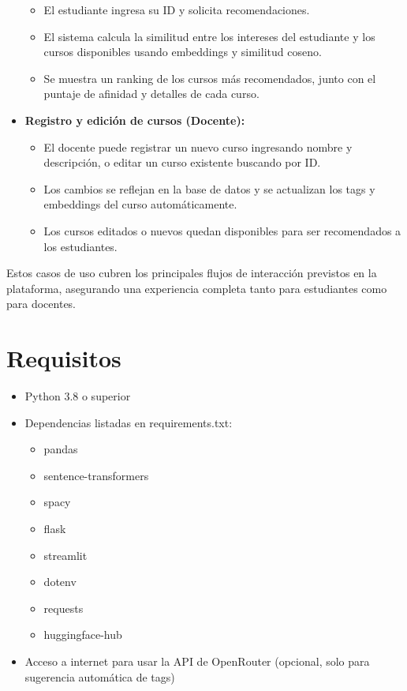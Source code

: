 \documentclass[12pt]{article}
\begin{document}
\begin{itemize}
    \begin{itemize}
        \item El estudiante ingresa su ID y solicita recomendaciones.
        \item El sistema calcula la similitud entre los intereses del estudiante y los cursos disponibles usando embeddings y similitud coseno.
        \item Se muestra un ranking de los cursos más recomendados, junto con el puntaje de afinidad y detalles de cada curso.
    \end{itemize}
    \item \textbf{Registro y edición de cursos (Docente):}
    \begin{itemize}
        \item El docente puede registrar un nuevo curso ingresando nombre y descripción, o editar un curso existente buscando por ID.
        \item Los cambios se reflejan en la base de datos y se actualizan los tags y embeddings del curso automáticamente.
        \item Los cursos editados o nuevos quedan disponibles para ser recomendados a los estudiantes.
    \end{itemize}
\end{itemize}

Estos casos de uso cubren los principales flujos de interacción previstos en la plataforma, asegurando una experiencia completa tanto para estudiantes como para docentes.

\section{Requisitos}
\begin{itemize}
    \item Python 3.8 o superior
    \item Dependencias listadas en requirements.txt:
    \begin{itemize}
        \item pandas
        \item sentence-transformers
        \item spacy
        \item flask
        \item streamlit
        \item dotenv
        \item requests
        \item huggingface-hub
    \end{itemize}
    \item Acceso a internet para usar la API de OpenRouter (opcional, solo para sugerencia automática de tags)
\end{itemize}
\end{document}
